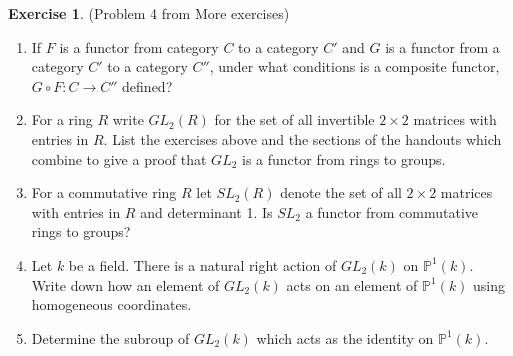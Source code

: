 \documentclass[12pt, psamsfonts]{amsart}
\theoremstyle{definition}
\newtheorem*{exer}{Exercise}
\theoremstyle{remark}
\numberwithin{equation}{section}
\begin{document}
\begin{exer}{(Problem 4 from More exercises)}
  \begin{enumerate}
    \item
      If $F$ is a functor from category $C$ to a category $C'$ and $G$ is a functor from a category $C'$ to a category $C''$, under what conditions is a composite functor, $G \circ F: C \rightarrow C''$ defined?
    \item
      For a ring $R$ write $GL_2(R)$ for the set of all invertible $2 \times 2$ matrices with entries in $R$.
      List the exercises above and the sections of the handouts which combine to give a proof that $GL_2$ is a functor from rings to groups.
    \item
      For a commutative ring $R$ let $SL_2(R)$ denote the set of all $2 \times 2$ matrices with entries in $R$ and determinant 1.
      Is $SL_2$ a functor from commutative rings to groups?
    \item
      Let $k$ be a field.
      There is a natural right action of $GL_2(k)$ on $\mathbb{P}^1(k)$.
      Write down how an element of $GL_2(k)$ acts on an element of $\mathbb{P}^1(k)$ using homogeneous coordinates.
    \item
      Determine the subroup of $GL_2(k)$ which acts as the identity on $\mathbb{P}^1(k)$.
  \end{enumerate}
\end{exer}
\end{document}
